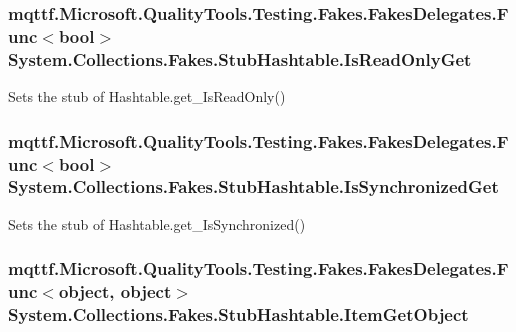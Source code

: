 \hypertarget{class_system_1_1_collections_1_1_fakes_1_1_stub_hashtable_a70bcec3288ddeff08a1abc6b91ae2aa6}{
\subsubsection[{Is\-Read\-Only\-Get}]{\setlength{\rightskip}{0pt plus 5cm}mqttf.\-Microsoft.\-Quality\-Tools.\-Testing.\-Fakes.\-Fakes\-Delegates.\-Func$<$bool$>$ System.\-Collections.\-Fakes.\-Stub\-Hashtable.\-Is\-Read\-Only\-Get}}\label{class_system_1_1_collections_1_1_fakes_1_1_stub_hashtable_a70bcec3288ddeff08a1abc6b91ae2aa6}


Sets the stub of Hashtable.\-get\-\_\-\-Is\-Read\-Only()

\hypertarget{class_system_1_1_collections_1_1_fakes_1_1_stub_hashtable_aab9f6cdcddb5299c5f8bd6aca7f85872}{
\subsubsection[{Is\-Synchronized\-Get}]{\setlength{\rightskip}{0pt plus 5cm}mqttf.\-Microsoft.\-Quality\-Tools.\-Testing.\-Fakes.\-Fakes\-Delegates.\-Func$<$bool$>$ System.\-Collections.\-Fakes.\-Stub\-Hashtable.\-Is\-Synchronized\-Get}}\label{class_system_1_1_collections_1_1_fakes_1_1_stub_hashtable_aab9f6cdcddb5299c5f8bd6aca7f85872}


Sets the stub of Hashtable.\-get\-\_\-\-Is\-Synchronized()

\hypertarget{class_system_1_1_collections_1_1_fakes_1_1_stub_hashtable_a96e973a21822ad1a15a2953a0a6ae70c}{
\subsubsection[{Item\-Get\-Object}]{\setlength{\rightskip}{0pt plus 5cm}mqttf.\-Microsoft.\-Quality\-Tools.\-Testing.\-Fakes.\-Fakes\-Delegates.\-Func$<$object, object$>$ System.\-Collections.\-Fakes.\-Stub\-Hashtable.\-Item\-Get\-Object}}\label{class_system_1_1_collections_1_1_fakes_1_1_stub_hashtable_a96e973a21822ad1a15a2953a0a6ae70c}


